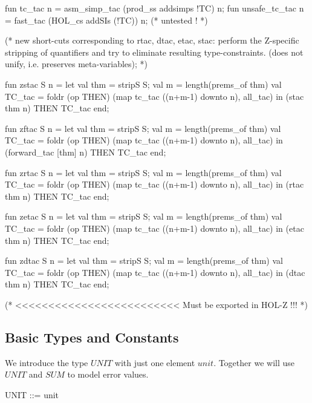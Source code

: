 \documentclass[a4paper,pdftex]{article}
\newenvironment{holz-proof}{\comment}{\endcomment}
\begin{document}
\begin{holz-proof}
fun tc_tac n = asm_simp_tac (prod_ss addsimps !TC) n;
fun unsafe_tc_tac n = fast_tac (HOL_cs addSIs (!TC)) n; (* untested ! *)


(* new short-cuts corresponding to rtac, dtac, etac, stac:
   perform the Z-specific stripping of quantifiers and 
   try to eliminate resulting type-constraints.
   (does not unify, i.e. preserves meta-variables); *)
 
fun zstac S n = let val thm = stripS S;
                    val m = length(prems_of thm)
                    val TC_tac = foldr (op THEN) 
                                 (map tc_tac ((n+m-1) downto n), all_tac)
                in  (stac thm n) THEN TC_tac end;


fun zftac S n = let val thm = stripS S;
                    val m = length(prems_of thm)
                    val TC_tac = foldr (op THEN) 
                                 (map tc_tac ((n+m-1) downto n), all_tac)
                in  (forward_tac [thm] n) THEN TC_tac end;


fun zrtac S n = let val thm = stripS S;
                    val m = length(prems_of thm)
                    val TC_tac = foldr (op THEN) 
                                 (map tc_tac ((n+m-1) downto n), all_tac)
                in  (rtac thm n) THEN TC_tac end;

fun zetac S n = let val thm = stripS S;
                    val m = length(prems_of thm)
                    val TC_tac = foldr (op THEN) 
                                 (map tc_tac ((n+m-1) downto n), all_tac)
                in  (etac thm n) THEN TC_tac end;

fun zdtac S n = let val thm = stripS S;
                    val m = length(prems_of thm)
                    val TC_tac = foldr (op THEN) 
                                 (map tc_tac ((n+m-1) downto n), all_tac)
                in  (dtac thm n) THEN TC_tac end;


(* <<<<<<<<<<<<<<<<<<<<<<<<< Must be exported in HOL-Z !!! *)


\end{holz-proof}

\subsection{Basic Types and Constants}



We introduce the type $UNIT$  with just one element $unit$.
Together we will use $UNIT$ and $SUM$ to model error values.
\begin{zed}
UNIT ::= unit 
\end{zed}
\end{document}
